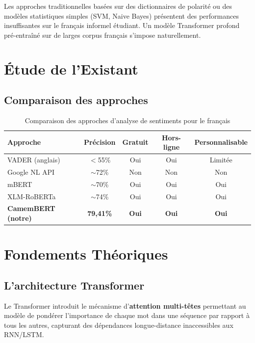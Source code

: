 \documentclass[12pt,a4paper,oneside]{report}
\begin{document}
Les approches traditionnelles basées sur des dictionnaires de polarité ou des
modèles statistiques simples (SVM, Naive Bayes) présentent des performances
insuffisantes sur le français informel étudiant. Un modèle Transformer profond
pré-entraîné sur de larges corpus français s'impose naturellement.

\section{Étude de l'Existant}

\subsection{Comparaison des approches}

\begin{table}[H]
\centering
\caption{Comparaison des approches d'analyse de sentiments pour le français}
\label{tab:comparaison}
\renewcommand{\arraystretch}{1.4}
\begin{tabular}{lcccc}
\toprule
\rowcolor{bleuprincipal!15}
\textbf{Approche} & \textbf{Précision} & \textbf{Gratuit} & \textbf{Hors-ligne} & \textbf{Personnalisable} \\
\midrule
VADER (anglais) & $<$55\% & Oui & Oui & Limitée \\
\rowcolor{gray!8}
Google NL API & $\sim$72\% & Non & Non & Non \\
mBERT & $\sim$70\% & Oui & Oui & Oui \\
\rowcolor{gray!8}
XLM-RoBERTa & $\sim$74\% & Oui & Oui & Oui \\
\rowcolor{vertprincipal!15}
\textbf{CamemBERT (notre)} & \textbf{79,41\%} & \textbf{Oui} & \textbf{Oui} & \textbf{Oui} \\
\bottomrule
\end{tabular}
\end{table}

\section{Fondements Théoriques}

\subsection{L'architecture Transformer}

Le Transformer \cite{vaswani2017attention} introduit le mécanisme
d'\textbf{attention multi-têtes} permettant au modèle de pondérer l'importance
de chaque mot dans une séquence par rapport à tous les autres, capturant
des dépendances longue-distance inaccessibles aux RNN/LSTM.
\end{document}
